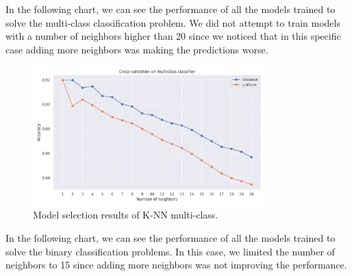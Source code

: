 \documentclass{Configuration_Files/PoliMi3i_thesis}
\begin{document}
In the following chart, we can see the performance of all the models trained to solve the multi-class classification problem. We did not attempt to train models with a number of neighbors higher than 20 since we noticed that in this specific case adding more neighbors was making the predictions worse.

\begin{figure}[H]
    \centering
    \includegraphics[width=0.8\textwidth]{Figures/knn_selection_m.png}
    \caption{Model selection results of K-NN multi-class.}
    \label{fig:knn_sel_m}
\end{figure}

In the following chart, we can see the performance of all the models trained to solve the binary classification problems. In this case, we limited the number of neighbors to 15 since adding more neighbors was not improving the performance. 
\end{document}
